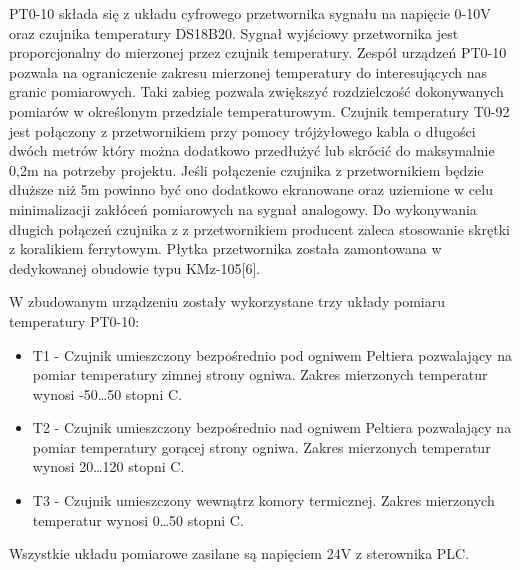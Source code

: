 \documentclass[oneside]{mgr}
\begin{document}
PT0-10 składa się z układu cyfrowego przetwornika sygnału na napięcie 0-10V oraz czujnika temperatury DS18B20. Sygnał wyjściowy przetwornika jest proporcjonalny do mierzonej przez czujnik temperatury. Zespół urządzeń PT0-10 pozwala na ograniczenie zakresu mierzonej temperatury do interesujących nas granic pomiarowych. Taki zabieg pozwala zwiększyć rozdzielczość dokonywanych pomiarów w określonym przedziale temperaturowym. Czujnik temperatury T0-92 jest połączony z przetwornikiem przy pomocy trójżyłowego kabla o długości dwóch metrów który można dodatkowo przedłużyć lub skrócić do maksymalnie 0,2m na potrzeby projektu. Jeśli połączenie czujnika z przetwornikiem będzie dłuższe niż 5m powinno być ono dodatkowo ekranowane oraz uziemione w celu minimalizacji zakłóceń pomiarowych na sygnał analogowy. Do wykonywania długich połączeń czujnika z z przetwornikiem producent zaleca stosowanie skrętki z koralikiem ferrytowym. Płytka przetwornika została zamontowana w dedykowanej obudowie typu KMz-105[6].

W zbudowanym urządzeniu zostały wykorzystane trzy układy pomiaru temperatury PT0-10:
\begin{itemize}
    \item T1 - Czujnik umieszczony bezpośrednio pod ogniwem Peltiera pozwalający na pomiar temperatury zimnej strony ogniwa. Zakres mierzonych temperatur wynosi -50\dots50 stopni C.
    \item T2 - Czujnik umieszczony bezpośrednio nad ogniwem Peltiera pozwalający na pomiar temperatury gorącej strony ogniwa. Zakres mierzonych temperatur wynosi 20\dots120 stopni C.
    \item T3 - Czujnik umieszczony wewnątrz komory termicznej. Zakres mierzonych temperatur wynosi 0\dots50 stopni C.
\end{itemize}

Wszystkie układu pomiarowe zasilane są napięciem 24V z sterownika PLC.
\end{document}
